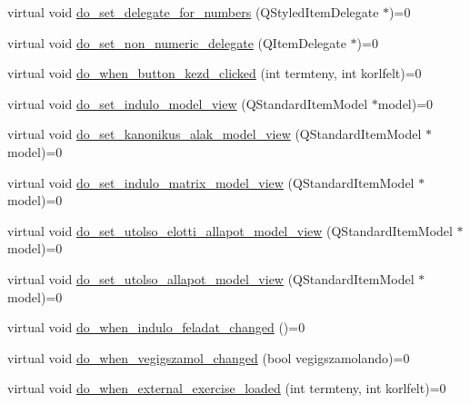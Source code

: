 \begin{DoxyCompactItemize}
\item 
virtual void \hyperlink{classMainwindow__Gui__Plugin__Interface_a3d3bd884be00beed1591b6856c051d97}{do\+\_\+set\+\_\+delegate\+\_\+for\+\_\+numbers} (Q\+Styled\+Item\+Delegate $\ast$)=0
\item 
virtual void \hyperlink{classMainwindow__Gui__Plugin__Interface_a7fb8659febc1f411b057c218a384533d}{do\+\_\+set\+\_\+non\+\_\+numeric\+\_\+delegate} (Q\+Item\+Delegate $\ast$)=0
\item 
virtual void \hyperlink{classMainwindow__Gui__Plugin__Interface_adb2a0db1dc3a4acbbe3face497fea03d}{do\+\_\+when\+\_\+button\+\_\+kezd\+\_\+clicked} (int termteny, int korlfelt)=0
\item 
virtual void \hyperlink{classMainwindow__Gui__Plugin__Interface_abe103d1b14201821ceeb84d74d38fa44}{do\+\_\+set\+\_\+indulo\+\_\+model\+\_\+view} (Q\+Standard\+Item\+Model $\ast$model)=0
\item 
virtual void \hyperlink{classMainwindow__Gui__Plugin__Interface_a2f84462e9b23256f5c950837593e70e7}{do\+\_\+set\+\_\+kanonikus\+\_\+alak\+\_\+model\+\_\+view} (Q\+Standard\+Item\+Model $\ast$model)=0
\item 
virtual void \hyperlink{classMainwindow__Gui__Plugin__Interface_af65d38dfc3559e57881db85107d3a5d5}{do\+\_\+set\+\_\+indulo\+\_\+matrix\+\_\+model\+\_\+view} (Q\+Standard\+Item\+Model $\ast$model)=0
\item 
virtual void \hyperlink{classMainwindow__Gui__Plugin__Interface_a69a54f81814ab596db924ff3e7e905ba}{do\+\_\+set\+\_\+utolso\+\_\+elotti\+\_\+allapot\+\_\+model\+\_\+view} (Q\+Standard\+Item\+Model $\ast$model)=0
\item 
virtual void \hyperlink{classMainwindow__Gui__Plugin__Interface_a843da4811bf198d0e3a41c119f684bf2}{do\+\_\+set\+\_\+utolso\+\_\+allapot\+\_\+model\+\_\+view} (Q\+Standard\+Item\+Model $\ast$model)=0
\item 
virtual void \hyperlink{classMainwindow__Gui__Plugin__Interface_a844f70d7abef6c8a80a29247d9156bad}{do\+\_\+when\+\_\+indulo\+\_\+feladat\+\_\+changed} ()=0
\item 
virtual void \hyperlink{classMainwindow__Gui__Plugin__Interface_a923f8d92254deadb309f933167c3da70}{do\+\_\+when\+\_\+vegigszamol\+\_\+changed} (bool vegigszamolando)=0
\item 
virtual void \hyperlink{classMainwindow__Gui__Plugin__Interface_ae30876cb084cfce359428e5ffb839ef5}{do\+\_\+when\+\_\+external\+\_\+exercise\+\_\+loaded} (int termteny, int korlfelt)=0
\item 

\end{DoxyCompactItemize}
